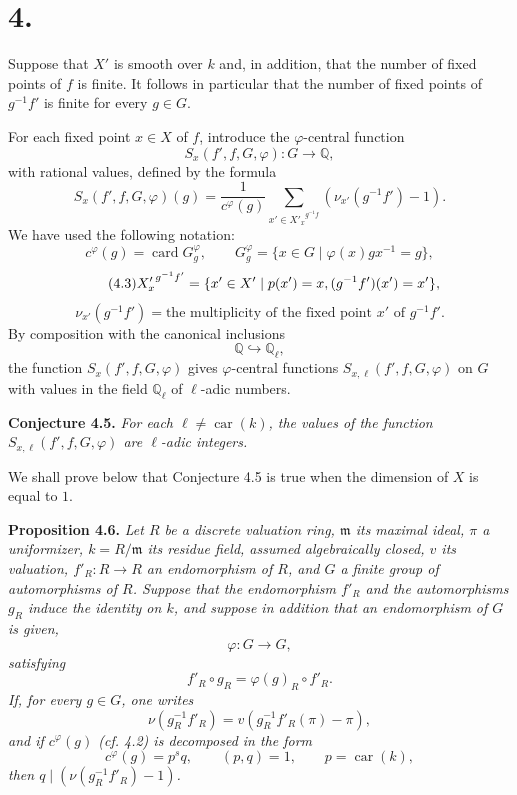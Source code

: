 \documentclass[11pt]{article}
\providecommand{\fm}{\mathfrak{m}}
\providecommand{\car}{\operatorname{car}}
\providecommand{\car}{\operatorname{car}}
\providecommand{\bQ}{\mathbb Q}
\providecommand{\fm}{\mathfrak m}
\providecommand{\card}{\operatorname{card}}
\providecommand{\car}{\operatorname{car}}
\begin{document}
\section*{4.}
Suppose that $X'$ is smooth over $k$ and, in addition, that the number of fixed points of $f$ is finite. It follows in particular that the number of fixed points of $g^{-1}f'$ is finite for every $g\in G$.

For each fixed point $x\in X$ of $f$, introduce the $\varphi$-central function
\[
S_x(f',f,G,\varphi):G\longrightarrow \bQ,
\]
with rational values, defined by the formula
\begin{equation}\tag{4.1}
S_x(f',f,G,\varphi)(g)=
\frac{1}{c^\varphi(g)}
\sum_{x'\in {X'_x}^{g^{-1}f}}(\nu_{x'}(g^{-1}f')-1).
\end{equation}
We have used the following notation:
\begin{equation}\tag{4.2}
c^\varphi(g)=\card G_g^\varphi,
\qquad
G_g^\varphi=\{x\in G\mid \varphi(x)gx^{-1}=g\},
\end{equation}
\begin{equation}\tag{4.3}
{X'_x}^{g^{-1}f'}=\{x'\in X'\mid p(x')=x,\\ (g^{-1}f')(x')=x'\},
\end{equation}
\begin{equation}\tag{4.4}
\nu_{x'}(g^{-1}f')=\text{the multiplicity of the fixed point }x'\text{ of }g^{-1}f'.
\end{equation}
By composition with the canonical inclusions
\[
\bQ\hookrightarrow \bQ_\ell,
\]
the function $S_x(f',f,G,\varphi)$ gives $\varphi$-central functions $S_{x,\ell}(f',f,G,\varphi)$ on $G$ with values in the field $\bQ_\ell$ of $\ell$-adic numbers.

\medskip
\noindent
\textbf{Conjecture 4.5.} \emph{For each $\ell\ne\car(k)$, the values of the function $S_{x,\ell}(f',f,G,\varphi)$ are $\ell$-adic integers.}

\medskip
We shall prove below that Conjecture 4.5 is true when the dimension of $X$ is equal to $1$.

\medskip
\noindent
\textbf{Proposition 4.6.} \emph{Let $R$ be a discrete valuation ring, $\fm$ its maximal ideal, $\pi$ a uniformizer, $k=R/\fm$ its residue field, assumed algebraically closed, $v$ its valuation, $f'_R:R\to R$ an endomorphism of $R$, and $G$ a finite group of automorphisms of $R$. Suppose that the endomorphism $f'_R$ and the automorphisms $g_R$ induce the identity on $k$, and suppose in addition that an endomorphism of $G$ is given,
\[
\varphi:G\longrightarrow G,
\]
satisfying
\[
f'_R\circ g_R=\varphi(g)_R\circ f'_R.
\]
If, for every $g\in G$, one writes
\[
\nu(g_R^{-1}f'_R)=v(g_R^{-1}f'_R(\pi)-\pi),
\]
and if $c^\varphi(g)$ (cf. 4.2) is decomposed in the form
\[
c^\varphi(g)=p^sq,
\qquad (p,q)=1,
\qquad p=\car(k),
\]
then $q\mid(\nu(g_R^{-1}f'_R)-1)$.}
\end{document}
